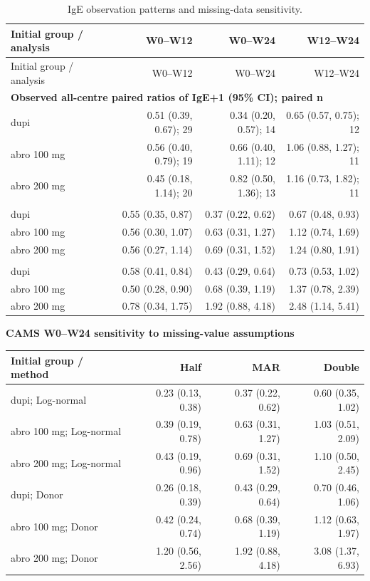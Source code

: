 {\small\setlength{\tabcolsep}{4pt}
\begin{longtable}{p{49mm}rrr}
\caption{IgE observation patterns and missing-data sensitivity.}\label{tab:ige_missingness}\\
\toprule Initial group / analysis & W0--W12 & W0--W24 & W12--W24 \\ \midrule\endfirsthead
\toprule Initial group / analysis & W0--W12 & W0--W24 & W12--W24 \\ \midrule\endhead
\multicolumn{4}{l}{\textbf{Observed all-centre paired ratios of IgE+1 (95\% CI); paired n}} \\
dupi & 0.51 (0.39, 0.67); 29 & 0.34 (0.20, 0.57); 14 & 0.65 (0.57, 0.75); 12 \\
abro 100 mg & 0.56 (0.40, 0.79); 19 & 0.66 (0.40, 1.11); 12 & 1.06 (0.88, 1.27); 11 \\
abro 200 mg & 0.45 (0.18, 1.14); 20 & 0.82 (0.50, 1.36); 13 & 1.16 (0.73, 1.82); 11 \\
\addlinespace\multicolumn{4}{l}{\textbf{Posterior log-normal imputation: CAMS, MAR}} \\
dupi & 0.55 (0.35, 0.87) & 0.37 (0.22, 0.62) & 0.67 (0.48, 0.93) \\
abro 100 mg & 0.56 (0.30, 1.07) & 0.63 (0.31, 1.27) & 1.12 (0.74, 1.69) \\
abro 200 mg & 0.56 (0.27, 1.14) & 0.69 (0.31, 1.52) & 1.24 (0.80, 1.91) \\
\addlinespace\multicolumn{4}{l}{\textbf{Within-treatment donor imputation: CAMS, MAR}} \\
dupi & 0.58 (0.41, 0.84) & 0.43 (0.29, 0.64) & 0.73 (0.53, 1.02) \\
abro 100 mg & 0.50 (0.28, 0.90) & 0.68 (0.39, 1.19) & 1.37 (0.78, 2.39) \\
abro 200 mg & 0.78 (0.34, 1.75) & 1.92 (0.88, 4.18) & 2.48 (1.14, 5.41) \\
\bottomrule\end{longtable}
}
\textbf{CAMS W0--W24 sensitivity to missing-value assumptions}\par\smallskip
{\small\begin{tabular}{p{49mm}rrr}\toprule Initial group / method & Half & MAR & Double \\ \midrule
dupi; Log-normal & 0.23 (0.13, 0.38) & 0.37 (0.22, 0.62) & 0.60 (0.35, 1.02) \\
abro 100 mg; Log-normal & 0.39 (0.19, 0.78) & 0.63 (0.31, 1.27) & 1.03 (0.51, 2.09) \\
abro 200 mg; Log-normal & 0.43 (0.19, 0.96) & 0.69 (0.31, 1.52) & 1.10 (0.50, 2.45) \\
dupi; Donor & 0.26 (0.18, 0.39) & 0.43 (0.29, 0.64) & 0.70 (0.46, 1.06) \\
abro 100 mg; Donor & 0.42 (0.24, 0.74) & 0.68 (0.39, 1.19) & 1.12 (0.63, 1.97) \\
abro 200 mg; Donor & 1.20 (0.56, 2.56) & 1.92 (0.88, 4.18) & 3.08 (1.37, 6.93) \\
\bottomrule\end{tabular}}

